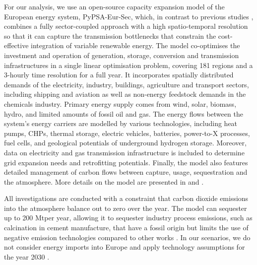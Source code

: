 

For our analysis, we use an open-source capacity expansion model of the European
energy system, PyPSA-Eur-Sec, which, in contrast to previous studies
\cite{henningComprehensiveModel2014,mathiesenSmartEnergy2015,connollySmartEnergy2016,lofflerDesigningModel2017,blancoPotentialHydrogen2018,brownSynergiesSector2018,in-depth_2018,victoria2020},
combines a fully sector-coupled approach with a high spatio-temporal resolution
so that it can capture the transmission bottlenecks that constrain the
cost-effective integration of variable renewable energy. The model co-optimises
the investment and operation of generation, storage, conversion and transmission
infrastructures in a single linear optimisation problem, covering 181 regions
and a 3-hourly time resolution for a full year. It incorporates spatially
distributed demands of the electricity, industry, buildings, agriculture and
transport sectors, including shipping and aviation as well as non-energy
feedstock demands in the chemicals industry. Primary energy supply comes from
wind, solar, biomass, hydro, and limited amounts of fossil oil and gas. The
energy flows between the system's energy carriers are modelled by various
technologies, including heat pumps, CHPs, thermal storage, electric vehicles,
batteries, power-to-X processes, fuel cells, and geological potentials of
underground hydrogen storage. Moreover, data on electricity and gas transmission
infrastructure is included to determine grid expansion needs and retrofitting
potentials. Finally, the model also features detailed management of carbon flows
between capture, usage, sequestration and the atmosphere. More details on the
model are presented in  and .


All investigations are conducted with a constraint that carbon dioxide emissions
into the atmosphere balance out to zero over the year. The model can sequester
up to 200 Mt\co per year, allowing it to sequester industry process emissions,
such as calcination in cement manufacture, that have a fossil origin but limits
the use of negative emission technologies compared to other works
\cite{blancoPotentialHydrogen2018}. In our scenarios, we do not
consider energy imports into Europe and apply technology assumptions for
the year 2030 \cite{DEA}.

